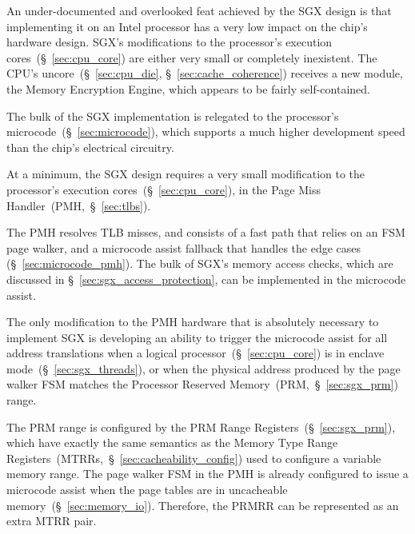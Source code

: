 \label{sec:sgx_implementation_overview}


An under-documented and overlooked feat achieved by the SGX design is that
implementing it on an Intel processor has a very low impact on the chip's
hardware design. SGX's modifications to the processor's execution
cores~(\S~\ref{sec:cpu_core}) are either very small or completely inexistent.
The CPU's uncore~(\S~\ref{sec:cpu_die}, \S~\ref{sec:cache_coherence}) receives
a new module, the  Memory Encryption Engine, which appears to be fairly
self-contained.

The bulk of the SGX implementation is relegated to the processor's
microcode~(\S~\ref{sec:microcode}), which supports a much higher development
speed than the chip's electrical circuitry.


\label{sec:sgx_core_modifications}


At a minimum, the SGX design requires a very small modification to the
processor's execution cores~(\S~\ref{sec:cpu_core}), in the Page Miss
Handler~(PMH,~\S~\ref{sec:tlbs}).

The PMH resolves TLB misses, and consists of a fast path that relies on an FSM
page walker, and a microcode assist fallback that handles the edge cases
(\S~\ref{sec:microcode_pmh}). The bulk of SGX's memory access checks, which are
discussed in \S~\ref{sec:sgx_access_protection}, can be implemented in the
microcode assist.

The only modification to the PMH hardware that is absolutely necessary to
implement SGX is developing an ability to trigger the microcode assist for all
address translations when a logical processor~(\S~\ref{sec:cpu_core}) is in
enclave mode~(\S~\ref{sec:sgx_threads}), or when the physical address produced
by the page walker FSM matches the Processor Reserved
Memory~(PRM,~\S~\ref{sec:sgx_prm}) range.

The PRM range is configured by the PRM Range Registers~(\S~\ref{sec:sgx_prm}),
which have exactly the same semantics as the Memory Type Range
Registers~(MTRRs,~\S~\ref{sec:cacheability_config}) used to configure a
variable memory range. The page walker FSM in the PMH is already configured to
issue a microcode assist when the page tables are in uncacheable
memory~(\S~\ref{sec:memory_io}). Therefore, the PRMRR can be represented as an
extra MTRR pair.


